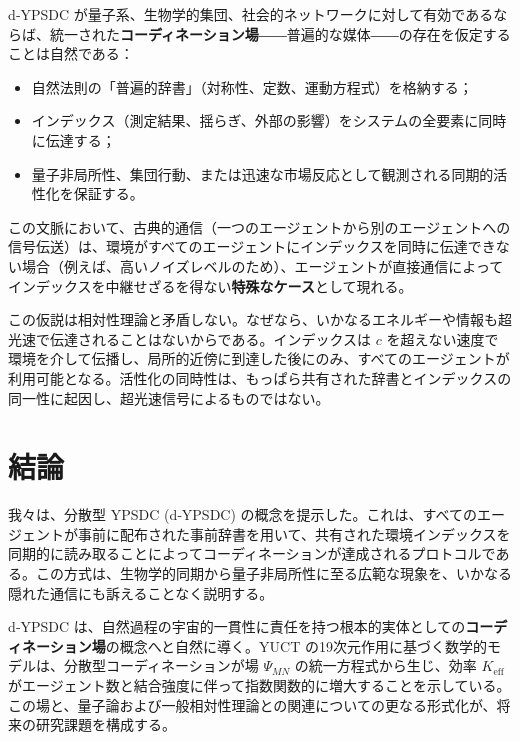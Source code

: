 \documentclass[11pt,a4paper]{article}
\begin{document}
	d‑YPSDC が量子系、生物学的集団、社会的ネットワークに対して有効であるならば、統一された\textbf{コーディネーション場}――普遍的な媒体――の存在を仮定することは自然である：
	
	\begin{itemize}
		\item 自然法則の「普遍的辞書」（対称性、定数、運動方程式）を格納する；
		\item インデックス（測定結果、揺らぎ、外部の影響）をシステムの全要素に同時に伝達する；
		\item 量子非局所性、集団行動、または迅速な市場反応として観測される同期的活性化を保証する。
	\end{itemize}
	
	この文脈において、古典的通信（一つのエージェントから別のエージェントへの信号伝送）は、環境がすべてのエージェントにインデックスを同時に伝達できない場合（例えば、高いノイズレベルのため）、エージェントが直接通信によってインデックスを中継せざるを得ない\textbf{特殊なケース}として現れる。
	
	この仮説は相対性理論と矛盾しない。なぜなら、いかなるエネルギーや情報も超光速で伝達されることはないからである。インデックスは \(c\) を超えない速度で環境を介して伝播し、局所的近傍に到達した後にのみ、すべてのエージェントが利用可能となる。活性化の同時性は、もっぱら共有された辞書とインデックスの同一性に起因し、超光速信号によるものではない。
	
	\section{結論}
	
	我々は、分散型 YPSDC (d‑YPSDC) の概念を提示した。これは、すべてのエージェントが事前に配布された事前辞書を用いて、共有された環境インデックスを同期的に読み取ることによってコーディネーションが達成されるプロトコルである。この方式は、生物学的同期から量子非局所性に至る広範な現象を、いかなる隠れた通信にも訴えることなく説明する。
	
	d‑YPSDC は、自然過程の宇宙的一貫性に責任を持つ根本的実体としての\textbf{コーディネーション場}の概念へと自然に導く。YUCT の19次元作用に基づく数学的モデルは、分散型コーディネーションが場 \(\Psi_{MN}\) の統一方程式から生じ、効率 \(K_{\mathrm{eff}}\) がエージェント数と結合強度に伴って指数関数的に増大することを示している。この場と、量子論および一般相対性理論との関連についての更なる形式化が、将来の研究課題を構成する。
	
\end{document}
